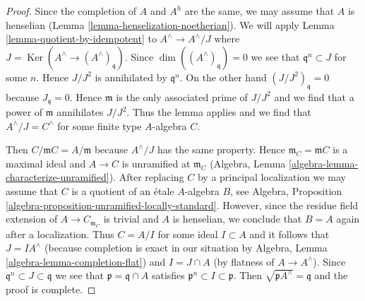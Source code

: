 \documentclass[10pt,a4paper]{amsart}
\theoremstyle{plain}
\theoremstyle{definition}
\theoremstyle{remark}
\numberwithin{equation}{subsection}
\def\Ker{\mathop{\mathrm{Ker}}}
\begin{document}
\begin{proof}
Since the completion of $A$ and $A^h$ are the same, we may assume
that $A$ is henselian (Lemma \ref{lemma-henselization-noetherian}).
We will apply Lemma \ref{lemma-quotient-by-idempotent}
to $A^\wedge \to A^\wedge/J$ where
$J = \Ker(A^\wedge \to (A^\wedge)_{\mathfrak q})$.
Since $\dim((A^\wedge)_\mathfrak q) = 0$ we see that
$\mathfrak q^n \subset J$ for some $n$. Hence $J/J^2$ is
annihilated by $\mathfrak q^n$. On the other hand $(J/J^2)_\mathfrak q = 0$
because $J_\mathfrak q = 0$. Hence $\mathfrak m$ is the only
associated prime of $J/J^2$ and we find that a power
of $\mathfrak m$ annihilates $J/J^2$. Thus the lemma applies
and we find that $A^\wedge/J = C^\wedge$ for some finite type
$A$-algebra $C$.

\medskip\noindent
Then $C/\mathfrak m C = A/\mathfrak m$ because $A^\wedge/J$ has the same
property. Hence $\mathfrak m_C = \mathfrak m C$ is a maximal ideal
and $A \to C$ is unramified at $\mathfrak m_C$
(Algebra, Lemma \ref{algebra-lemma-characterize-unramified}).
After replacing $C$ by a principal localization we may
assume that $C$ is a quotient of an \'etale $A$-algebra $B$, see
Algebra, Proposition \ref{algebra-proposition-unramified-locally-standard}.
However, since the residue field extension of $A \to C_{\mathfrak m_C}$
is trivial and $A$ is henselian, we conclude that $B = A$
again after a localization.
Thus $C = A/I$ for some ideal $I \subset A$ and it follows that
$J = IA^\wedge$ (because completion is exact in our situation by
Algebra, Lemma \ref{algebra-lemma-completion-flat}) and $I = J \cap A$
(by flatness of $A \to A^\wedge$). Since
$\mathfrak q^n \subset J \subset \mathfrak q$ we see that
$\mathfrak p = \mathfrak q \cap A$ satisfies
$\mathfrak p^n \subset I \subset \mathfrak p$.
Then $\sqrt{\mathfrak p A^\wedge} = \mathfrak q$ and the proof is complete.
\end{proof}
\end{document}
